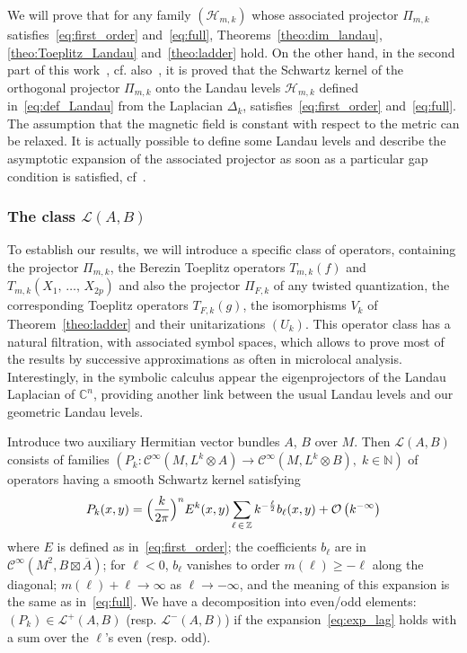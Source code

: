 \documentclass[10pt,a4paper]{article}
\theoremstyle{definition}
\numberwithin{equation}{section}
\newcommand{\N}{{\mathbb{N}}}
\newcommand{\C}{{\mathbb{C}}}
\newcommand{\Z}{{\mathbb{Z}}}
\newcommand{\con}{\overline}
\newcommand{\Ci}{{\mathcal{C}}^{\infty}}
\newcommand{\bigo}{\mathcal{O}}
\newcommand{\lag}{\mathcal{L}}
\newcommand{\Hilb}{\mathcal{H}}
\begin{document}
We will prove that for any family $(\Hilb_{m,k})$ whose associated projector $\Pi_{m,k}$ satisfies~\eqref{eq:first_order} and~\eqref{eq:full}, Theorems~\ref{theo:dim_landau}, \ref{theo:Toeplitz_Landau} and~\ref{theo:ladder} hold. On the other hand, in the second part of this work~\cite{oim_copain}, cf. also~\cite{Yuri_1}, it is proved that the Schwartz kernel of the orthogonal projector $\Pi_{m,k}$ onto the Landau levels $\Hilb_{m,k}$ defined in~\eqref{eq:def_Landau} from the Laplacian $\Delta_k$, satisfies~\eqref{eq:first_order} and~\eqref{eq:full}. The assumption that the magnetic field is constant with respect to the metric can be relaxed. It is actually possible to define some Landau levels and describe the asymptotic expansion of the associated projector as soon as a particular gap condition is satisfied, cf~\cite{oim_copain}.

\break
\subsubsection{The class $\lag (A,B)$}
To establish our results, we will introduce a specific class of operators, containing the projector $\Pi_{m,k}$, the Berezin Toeplitz operators $T_{m,k} (f)$ and $T_{m,k} (X_1,\,\ldots,\,X_{2p})$ and also the projector $\Pi_{F,k}$ of any twisted quantization, the corresponding Toeplitz operators $T_{F,k} (g)$, the isomorphisms $V_k$ of Theorem~\ref{theo:ladder} and their unitarizations $(U_k)$. This operator class has a natural filtration, with associated symbol spaces, which allows to prove most of the results by successive approximations as often in microlocal analysis. Interestingly, in the symbolic calculus appear the eigenprojectors of  the Landau Laplacian of $\C^n$, providing another link between the usual Landau levels and our geometric Landau levels. 

Introduce two auxiliary Hermitian vector bundles $A$, $B$ over $ M$. Then $\lag (A,B)$ consists of families $(P_k : \Ci(M, L^k \otimes A) \rightarrow \Ci(M, L^k \otimes B), \; k \in \N)$ of operators having a smooth Schwartz kernel satisfying
\begin{gather}\label{eq:exp_lag}
P_k (x,y) = \Bigl(\frac{k}{2\pi} \Bigr)^n E^{k}(x,y) \sum_{\ell\, \in\,\Z } k^{-\frac{\ell}{2}} b_{\ell}(x,y) + \bigo \left(k^{- \infty}\right)
\end{gather}
where $E$ is defined as in~\eqref{eq:first_order}; the coefficients $b_{\ell} $ are in $\Ci (M^2, B \boxtimes \con{A})$; for $\ell <0$, $b_{\ell}$ vanishes to order $m (\ell)
\geqslant -\ell $ along the diagonal; $m(\ell) + \ell \rightarrow \infty $ as $\ell
\rightarrow - \infty$, and the meaning of this expansion is the same as in~\eqref{eq:full}. We have a decomposition into even/odd elements: $(P_k) \in \lag^{+} (A,B)$ (resp. $\lag^{-} (A,B)$) if the expansion~\eqref{eq:exp_lag} holds with a sum over the $\ell$'s even (resp. odd).
\end{document}
